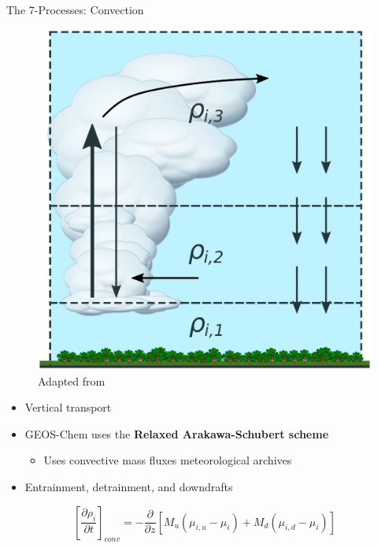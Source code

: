\documentclass[10pt]{beamer}
\begin{document}
\begin{frame}[fragile]{The 7-Processes: Convection}
    \begin{minipage}[c]{0.5\textwidth}
        \begin{figure}
            \centering
            \includegraphics[width=\textwidth]{box-model-convection.eps}
            \captionsetup{labelformat=empty}
            \caption{Adapted from \cite{brasseur_modeling_2017}}
        \end{figure}
    \end{minipage}
    \begin{minipage}[c]{0.49\textwidth}
        \begin{itemize}
            \item Vertical transport
            \vspace{4mm}
            \item GEOS-Chem uses the \textbf{Relaxed Arakawa-Schubert scheme}
            \vspace{4mm}
            \begin{itemize}
                \item Uses convective mass fluxes meteorological archives
            \end{itemize}
            \vspace{4mm}
            \item Entrainment, detrainment, and downdrafts
        \end{itemize}
    \end{minipage}
    $$
        \left[ \frac{\partial \rho_i}{\partial t} \right]_{conv} = - \frac{\partial}{\partial z} \left[M_u (\mu_{i,u} - \mu_{i}) + M_d (\mu_{i,d} - \mu_{i}) \right] 
    $$
\end{frame}
\end{document}
